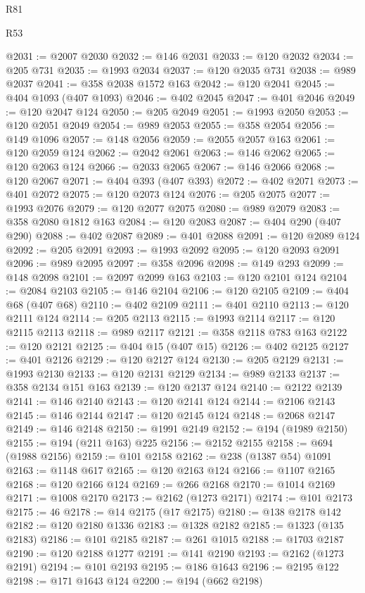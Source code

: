 \begin{lexlean}{R81}
\begin{lexlean}{R53}
\begin{coremodule}
{{{{{{{{{{{{{{{{{{{{{{{{{{{{{{{{{{{{{{{{{{{{{{{{{{{{{{{{{{{{{{{{{{{{{{{{{{{{{{{{{{{{{{{{{{{{{{{{{{{{{{{{{{{{{{{{@2031 := @2007 @2030
@2032 := @146 @2031
@2033 := @120 @2032
@2034 := @205 @731
@2035 := @1993 @2034
@2037 := @120 @2035 @731
@2038 := @989 @2037
@2041 := @358 @2038 @1572 @163
@2042 := @120 @2041
@2045 := @404 @1093 (@407 @1093)
@2046 := @402 @2045
@2047 := @401 @2046
@2049 := @120 @2047 @124
@2050 := @205 @2049
@2051 := @1993 @2050
@2053 := @120 @2051 @2049
@2054 := @989 @2053
@2055 := @358 @2054
@2056 := @149 @1096
@2057 := @148 @2056
@2059 := @2055 @2057 @163
@2061 := @120 @2059 @124
@2062 := @2042 @2061
@2063 := @146 @2062
@2065 := @120 @2063 @124
@2066 := @2033 @2065
@2067 := @146 @2066
@2068 := @120 @2067
@2071 := @404 @393 (@407 @393)
@2072 := @402 @2071
@2073 := @401 @2072
@2075 := @120 @2073 @124
@2076 := @205 @2075
@2077 := @1993 @2076
@2079 := @120 @2077 @2075
@2080 := @989 @2079
@2083 := @358 @2080 @1812 @163
@2084 := @120 @2083
@2087 := @404 @290 (@407 @290)
@2088 := @402 @2087
@2089 := @401 @2088
@2091 := @120 @2089 @124
@2092 := @205 @2091
@2093 := @1993 @2092
@2095 := @120 @2093 @2091
@2096 := @989 @2095
@2097 := @358 @2096
@2098 := @149 @293
@2099 := @148 @2098
@2101 := @2097 @2099 @163
@2103 := @120 @2101 @124
@2104 := @2084 @2103
@2105 := @146 @2104
@2106 := @120 @2105
@2109 := @404 @68 (@407 @68)
@2110 := @402 @2109
@2111 := @401 @2110
@2113 := @120 @2111 @124
@2114 := @205 @2113
@2115 := @1993 @2114
@2117 := @120 @2115 @2113
@2118 := @989 @2117
@2121 := @358 @2118 @783 @163
@2122 := @120 @2121
@2125 := @404 @15 (@407 @15)
@2126 := @402 @2125
@2127 := @401 @2126
@2129 := @120 @2127 @124
@2130 := @205 @2129
@2131 := @1993 @2130
@2133 := @120 @2131 @2129
@2134 := @989 @2133
@2137 := @358 @2134 @151 @163
@2139 := @120 @2137 @124
@2140 := @2122 @2139
@2141 := @146 @2140
@2143 := @120 @2141 @124
@2144 := @2106 @2143
@2145 := @146 @2144
@2147 := @120 @2145 @124
@2148 := @2068 @2147
@2149 := @146 @2148
@2150 := @1991 @2149
@2152 := @194 (@1989 @2150)
@2155 := @194 (@211 @163) @225
@2156 := @2152 @2155
@2158 := @694 (@1988 @2156)
@2159 := @101 @2158
@2162 := @238 (@1387 @54) @1091
@2163 := @1148 @617
@2165 := @120 @2163 @124
@2166 := @1107 @2165
@2168 := @120 @2166 @124
@2169 := @266 @2168
@2170 := @1014 @2169
@2171 := @1008 @2170
@2173 := @2162 (@1273 @2171)
@2174 := @101 @2173
@2175 := 46
@2178 := @14 @2175 (@17 @2175)
@2180 := @138 @2178 @142
@2182 := @120 @2180 @1336
@2183 := @1328 @2182
@2185 := @1323 (@135 @2183)
@2186 := @101 @2185
@2187 := @261 @1015
@2188 := @1703 @2187
@2190 := @120 @2188 @1277
@2191 := @141 @2190
@2193 := @2162 (@1273 @2191)
@2194 := @101 @2193
@2195 := @186 @1643
@2196 := @2195 @122
@2198 := @171 @1643 @124
@2200 := @194 (@662 @2198)
}}}}}}}}}}}}}}}}}}}}}}}}}}}}}}}}}}}}}}}}}}}}}}}}}}}}}}}}}}}}}}}}}}}}}}}}}}}}}}}}}}}}}}}}}}}}}}}}}}}}}}}}}}}}}}}}
\end{coremodule}
\end{lexlean}
\end{lexlean}
